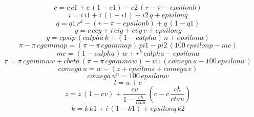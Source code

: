 \begin{dmath}
{{c}}={{c}}\, {c1}+{{c}}\, \left(1-{c1}\right)-{c2}\, \left({{r}}-{{\pi}}-{epsilonb}\right)
\end{dmath}
\begin{dmath}
{{i}}={{i}}\, {i1}+{{i}}\, \left(1-{i1}\right)+{i2}\, {{q}}+{epsilonq}
\end{dmath}
\begin{dmath}
{{q}}={q1}\, {{r^{k}}}-\left({{r}}-{{\pi}}-{epsilonb}\right)+{{q}}\, \left(1-{q1}\right)
\end{dmath}
\begin{dmath}
{{y}}={{c}}\, {ccy}+{{i}}\, {ciy}+{cvy}\, {{v}}+{epsilong}
\end{dmath}
\begin{dmath}
{{y}}={cpsip}\, \left({calpha}\, {{k}}+\left(1-{calpha}\right)\, {{n}}+{epsilona}\right)
\end{dmath}
\begin{dmath}
{{\pi}}-{{\pi}}\, {cgammap}=\left({{\pi}}-{{\pi}}\, {cgammap}\right)\, {pi1}-{pi2}\, \left(100\, {epsilonp}-{{mc}}\right)
\end{dmath}
\begin{dmath}
{{mc}}=\left(1-{calpha}\right)\, {{w}}+{{r^{k}}}\, {calpha}-{epsilona}
\end{dmath}
\begin{dmath}
{{\pi}}={{\pi}}\, {cgammaw}+{cbeta}\, \left({{\pi}}-{{\pi}}\, {cgammaw}\right)-{w1}\, \left({comega}\, {{u}}-100\, {epsilonw}\right)
\end{dmath}
\begin{dmath}
{comega}\, {{u}}={{w}}-\left({{z}}+{epsilons}+{comega}\, {{e}}\right)
\end{dmath}
\begin{dmath}
{comega}\, {{u^{n}}}=100\, {epsilonw}
\end{dmath}
\begin{dmath}
{{l}}={{u}}+{{e}}
\end{dmath}
\begin{dmath}
{{z}}={{z}}\, \left(1-{cv}\right)+\frac{{cv}}{1-\frac{{ch}}{{ctau}}}\, \left({{c}}-{{c}}\, \frac{{ch}}{{ctau}}\right)
\end{dmath}
\begin{dmath}
{{\bar{k}}}={{\bar{k}}}\, {k1}+{{i}}\, \left(1-{k1}\right)+{epsilonq}\, {k2}
\end{dmath}
